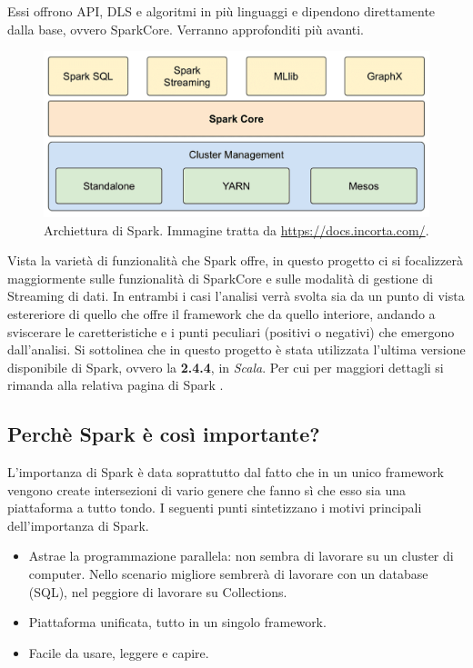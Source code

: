 \documentclass[12pt,italian]{article}
\begin{document}
Essi offrono API, DLS e algoritmi in più linguaggi e dipendono direttamente dalla base, ovvero SparkCore. Verranno approfonditi più avanti.
\begin{figure}[H]
	\centering 
	\includegraphics[width=1\linewidth]{img/sparkModules.png}
	\caption{Archiettura di Spark. Immagine tratta da \url{https://docs.incorta.com/}.}
	\label{fig:SparkModules}
\end{figure}
\par Vista la varietà di funzionalità che Spark offre, in questo progetto ci si focalizzerà maggiormente sulle funzionalità di SparkCore e sulle modalità di gestione di Streaming di dati. In entrambi i casi l'analisi verrà svolta sia da un punto di vista estereriore di quello che offre il framework che da quello interiore, andando a sviscerare le caretteristiche e i punti peculiari (positivi o negativi) che emergono dall'analisi. 
\newline
Si sottolinea che in questo progetto è stata utilizzata l'ultima versione disponibile di Spark, ovvero la \textbf{2.4.4}, in \textit{Scala}. Per cui per maggiori dettagli si rimanda alla relativa pagina di Spark \cite{spark}.
\subsection{Perchè Spark è così importante?}
L'importanza di Spark è data soprattutto dal fatto che in un unico framework vengono create intersezioni di vario genere che fanno sì che esso sia una piattaforma a tutto tondo. I seguenti punti sintetizzano i motivi principali dell'importanza di Spark.
\begin{itemize}
	\item Astrae la programmazione parallela: non sembra di lavorare su un cluster di computer.
	Nello scenario migliore sembrerà di lavorare con un database (SQL), nel peggiore di lavorare su Collections.
	\item Piattaforma unificata, tutto in un singolo framework.
	\item Facile da usare, leggere e capire.
\end{itemize}
\end{document}
